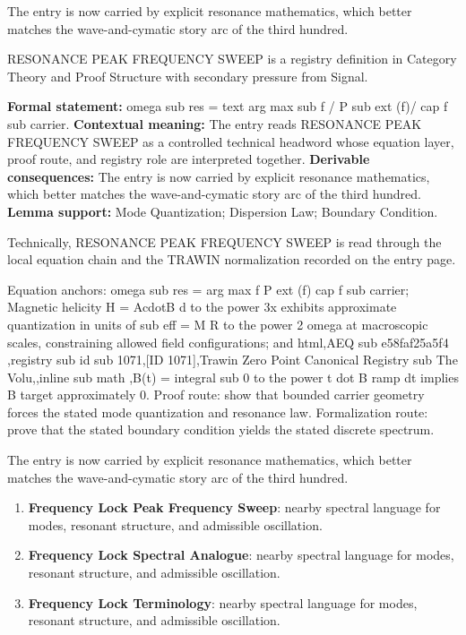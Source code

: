 The entry is now carried by explicit resonance mathematics, which better matches the wave-and-cymatic story arc of the third hundred.
\clearpage


\begingroup\small
{}
RESONANCE PEAK FREQUENCY SWEEP is a registry definition in Category Theory and Proof Structure with secondary pressure from Signal.

\begingroup\footnotesize\setlength{\emergencystretch}{3em}\sloppy
\textbf{Formal statement:} omega sub res = text arg max sub f / P sub ext (f)/ cap f sub carrier. \textbf{Contextual meaning:} The entry reads RESONANCE PEAK FREQUENCY SWEEP as a controlled technical headword whose equation layer, proof route, and registry role are interpreted together. \textbf{Derivable consequences:} The entry is now carried by explicit resonance mathematics, which better matches the wave-and-cymatic story arc of the third hundred. \textbf{Lemma support:} Mode Quantization; Dispersion Law; Boundary Condition.\par
\endgroup

Technically, RESONANCE PEAK FREQUENCY SWEEP is read through the local equation chain and the TRAWIN normalization recorded on the entry page.

Equation anchors: omega sub res = arg max f P ext (f) cap f sub carrier; Magnetic helicity H =   AcdotB d to the power 3x exhibits approximate quantization in units of   sub eff = M R to the power 2 omega at macroscopic scales, constraining allowed field configurations; and html,AEQ sub e58faf25a5f4 ,registry sub id sub 1071,[ID 1071],Trawin Zero Point Canonical Registry sub The Volu,,inline sub math ,B(t) = integral sub 0 to the power t dot B ramp dt implies B target approximately 0. Proof route: show that bounded carrier geometry forces the stated mode quantization and resonance law. Formalization route: prove that the stated boundary condition yields the stated discrete spectrum.

The entry is now carried by explicit resonance mathematics, which better matches the wave-and-cymatic story arc of the third hundred.
\endgroup

\begin{enumerate}[leftmargin=1.6em,itemsep=6pt,topsep=4pt]
\item \textbf{Frequency Lock Peak Frequency Sweep}: nearby spectral language for modes, resonant structure, and admissible oscillation.
\item \textbf{Frequency Lock Spectral Analogue}: nearby spectral language for modes, resonant structure, and admissible oscillation.
\item \textbf{Frequency Lock Terminology}: nearby spectral language for modes, resonant structure, and admissible oscillation.
\end{enumerate}


